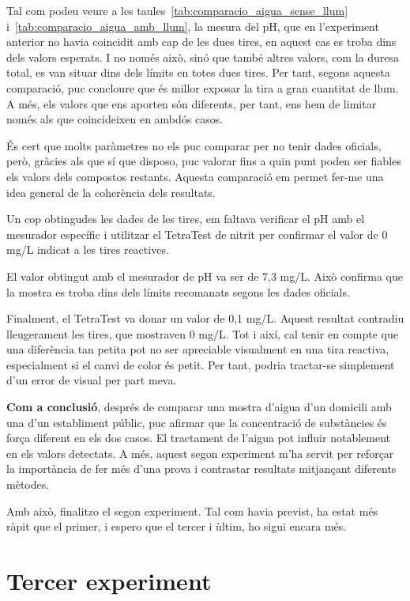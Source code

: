 Tal com podeu veure a les taules~\ref{tab:comparacio_aigua_sense_llum} i~\ref{tab:comparacio_aigua_amb_llum}, la mesura del pH, que en l’experiment anterior no havia coincidit amb cap de les dues tires, en aquest cas es troba dins dels valors esperats. I no només això, sinó que també altres valors, com la duresa total, es van situar dins dels límits en totes dues tires. Per tant, segons aquesta comparació, puc concloure que és millor exposar la tira a gran cuantitat de llum. A més, els valors que ens aporten són diferents, per tant, ens hem de limitar només als que coincideixen en ambdós casos.

És cert que molts paràmetres no els puc comparar per no tenir dades oficials, però, gràcies als que sí que disposo, puc valorar fins a quin punt poden ser fiables els valors dels compostos restants. Aquesta comparació em permet fer-me una idea general de la coherència dels resultats.

Un cop obtingudes les dades de les tires, em faltava verificar el pH amb el mesurador específic i utilitzar el TetraTest de nitrit per confirmar el valor de 0 mg/L indicat a les tires reactives.

El valor obtingut amb el mesurador de pH va ser de 7,3 mg/L. Això confirma que la mostra es troba dins dels límits recomanats segons les dades oficials.

Finalment, el TetraTest va donar un valor de 0,1 mg/L. Aquest resultat contradiu lleugerament les tires, que mostraven 0 mg/L. Tot i així, cal tenir en compte que una diferència tan petita pot no ser apreciable visualment en una tira reactiva, especialment si el canvi de color és petit. Per tant, podria tractar-se simplement d’un error de visual per part meva.

\textbf{Com a conclusió}, després de comparar una mostra d’aigua d’un domicili amb una d’un establiment públic, puc afirmar que la concentració de substàncies és força diferent en els dos casos. El tractament de l’aigua pot influir notablement en els valors detectats. A més, aquest segon experiment m’ha servit per reforçar la importància de fer més d’una prova i contrastar resultats mitjançant diferents mètodes.

Amb això, finalitzo el segon experiment. Tal com havia previst, ha estat més ràpit que el primer, i espero que el tercer i ùltim, ho sigui encara més.
\vspace{10cm}

\section{Tercer experiment}

